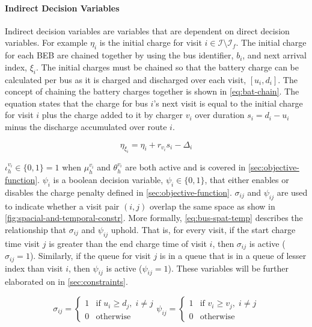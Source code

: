 \documentclass[11pt,a4paper,final]{article}
\newcommand{\Iset}{\mathcal{I}}             %
\newcommand{\Isetfinal}{\mathcal{I}_f}      %
\begin{document}
\paragraph{Indirect Decision Variables}
\label{sec:indirect-decision-variables}
Indirect decision variables are variables that are dependent on direct decision variables. For example \(\eta_i\) is the
initial charge for visit \(i \in \Iset \setminus \Isetfinal\). The initial charge for each BEB are chained together by using the bus
identifier, \(b_i\), and next arrival index, \(\xi_i\). The initial charges must be chained so that the battery charge can be
calculated per bus as it is charged and discharged over each visit, \([u_i, d_i]\). The concept of chaining the battery
charges together is shown in \ref{eq:bat-chain}. The equation states that the charge for bus \(i\)'s next visit is equal to the
initial charge for visit \(i\) plus the charge added to it by charger \(v_i\) over duration \(s_i = d_i - u_i\) minus the
discharge accumulated over route \(i\).

\begin{equation}
\label{eq:bat-chain}
  \eta_{\xi_i} = \eta_i + r_{v_i}s_i - \Delta_i
\end{equation}

\(\iota_h^{v_i} \in \{0,1\} = 1\) when \(\mu_h^{v_i}\) and \(\theta_h^{v_i}\) are both active and is covered in \ref{sec:objective-function}.
\(\psi_i\) is a boolean decision variable, \(\psi_i \in \{0,1\}\), that either enables or disables the charge penalty defined in
\ref{sec:objective-function}. \(\sigma_{ij}\) and \(\psi_{ij}\) are used to indicate whether a visit pair \((i, j)\) overlap the same space
as show in \ref{fig:spacial-and-temporal-constr}. More formally, \ref{eq:bus-spat-temp} describes the relationship that \(\sigma_{ij}\) and
\(\psi_{ij}\) uphold. That is, for every visit, if the start charge time visit \(j\) is greater than the end charge time of
visit \(i\), then \(\sigma_{ij}\) is active (\(\sigma_{ij} = 1\)). Similarly, if the queue for visit \(j\) is in a queue that is in a
queue of lesser index than visit \(i\), then \(\psi_{ij}\) is active (\(\psi_{ij} = 1\)). These variables will be further elaborated
on in \ref{sec:constraints}.

\begin{subequations}
\label{eq:bus-spat-temp}
\begin{equation}
  \sigma_{ij} =
  \begin{cases}
    1 & \text{if } u_i \ge d_j, \; i \ne j\\
    0 & \text{otherwise}
  \end{cases}
\end{equation}

\begin{equation}
  \psi_{ij} =
  \begin{cases}
    1 & \text{if } v_i \ge v_j,\; i \ne j\\
    0 & \text{otherwise}
  \end{cases}
\end{equation}
\end{subequations}
\end{document}
